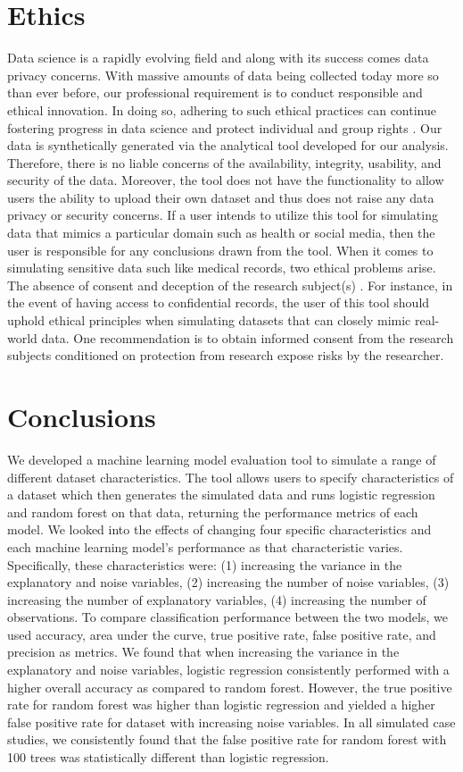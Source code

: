 \documentclass{llncs}
\begin{document}
\section{Ethics}
Data science is a rapidly evolving field and along with its success comes data privacy concerns. With massive amounts of data being collected today more so than ever before, our professional requirement is to conduct responsible and ethical innovation. In doing so, adhering to such ethical practices can continue fostering progress in data science and protect individual and group rights \cite{floridi}. Our data is synthetically generated via the analytical tool developed for our analysis. Therefore, there is no liable concerns of the availability, integrity, usability, and security of the data. Moreover, the tool does not have the functionality to allow users the ability to upload their own dataset and thus does not raise any data privacy or security concerns. If a user intends to utilize this tool for simulating data that mimics a particular domain such as health or social media, then the user is responsible for any conclusions drawn from the tool. When it comes to simulating sensitive data such like medical records, two ethical problems arise. The absence of consent and deception of the research subject(s) \cite{karin}. For instance, in the event of having access to confidential records, the user of this tool should uphold ethical principles when simulating datasets that can closely mimic real-world data. One recommendation is to obtain informed consent from the research subjects conditioned on protection from research expose risks by the researcher.


\section{Conclusions}
We developed a machine learning model evaluation tool to simulate a range of different dataset characteristics. The tool allows users to specify characteristics of a dataset which then generates the simulated data and runs logistic regression and random forest on that data, returning the performance metrics of each model. We looked into the effects of changing four specific characteristics and each machine learning model's performance as that characteristic varies.  Specifically, these characteristics were: (1) increasing the variance in the explanatory and noise variables, (2) increasing the number of noise variables, (3) increasing the number of explanatory variables, (4) increasing the number of observations. To compare classification performance between the two models, we used accuracy, area under the curve, true positive rate, false positive rate, and precision as metrics. We found that when increasing the variance in the explanatory and noise variables, logistic regression consistently performed with a higher overall accuracy as compared to random forest. However, the true positive rate for random forest was higher than logistic regression and yielded a higher false positive rate for dataset with increasing noise variables. In all simulated case studies, we consistently found that the false positive rate for random forest with 100 trees was statistically different than logistic regression. 
\end{document}

